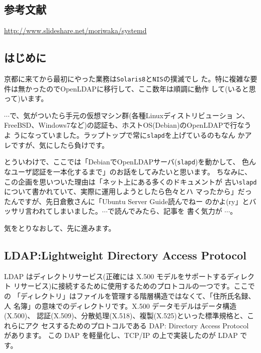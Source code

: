 \documentclass[mingoth,a4paper]{jsarticle}
\begin{document}
\subsection{参考文献}
\url{http://www.slideshare.net/moriwaka/systemd}


\subsection{はじめに}

京都に来てから最初にやった業務は\texttt{Solaris8}と\texttt{NIS}の撲滅でし
た。特に複雑な要件は無かったのでOpenLDAPに移行して、ここ数年は順調に動作
して(いると思って)います。

$\cdots$で、気がついたら手元の仮想マシン群(各種Linuxディストリビューショ
ン、FreeBSD、Windows7など)の認証も、ホストOS(Debian)のOpenLDAPで行なうよ
うになっていました。ラップトップで常に\texttt{slapd}を上げているのもなん
かアレですが、気にしたら負けです。

とういわけで、ここでは「DebianでOpenLDAPサーバ(\texttt{slapd})を動かして、
色んなユーザ認証を一本化するまで」のお話をしてみたいと思います。
%
ちなみに、この企画を思いついた理由は「ネット上にある多くのドキュメントが
古い\texttt{slapd}について書かれていて、実際に運用しようとしたら色々とハ
マったから」だったんですが、先日倉敷さんに「Ubuntu Server Guide読んでねー
のかよ(ry」とバッサリ言われてしまいました。$\cdots$で読んでみたら、記事を
書く気力が $\cdots$。

気をとりなおして、先に進みます。

\subsection{LDAP:Lightweight Directory Access Protocol}

LDAP はディレクトリサービス(正確には X.500 モデルをサポートするディレクト
リサービス)に接続するために使用するためのプロトコルの一つです。ここでの
「ディレクトリ」はファイルを管理する階層構造ではなくて、「住所氏名録、人
名簿」の意味でのディレクトリです。X.500 データモデルはデータ構造(X.500)、
認証(X.509)、分散処理(X.518)、複製(X.525)といった標準規格と、これらにアク
セスするためのプロトコルである DAP: Directory Access Protocol があります。
この DAP を軽量化し、TCP/IP の上で実装したのが LDAP です。
\end{document}
